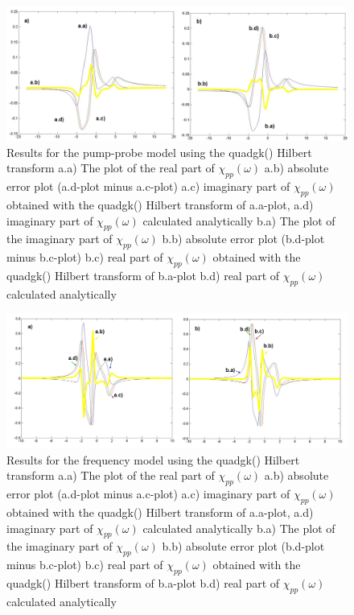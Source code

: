 \documentclass[12pt,twoside,a4paper]{article}
\numberwithin{equation}{subsection}
\numberwithin{figure}{subsection}
\begin{document}
\begin{figure} 
  \includegraphics[width=150mm]{img/quadgk_pnp.png}
  \caption{Results for the pump-probe model using the quadgk() Hilbert transform
     a.a) The plot of the real part of ${\chi_{pp}}(\omega )$
     a.b) absolute error plot (a.d-plot minus a.c-plot)
     a.c) imaginary part of ${\chi_{pp}}(\omega )$ obtained with the quadgk() Hilbert transform of a.a-plot, 
     a.d) imaginary part of ${\chi_{pp}}(\omega )$ calculated analytically 
     b.a) The plot of the imaginary part of ${\chi_{pp}}(\omega )$ 
     b.b) absolute error plot (b.d-plot minus b.c-plot)
     b.c) real part of $\chi_{pp} (\omega )$ obtained with the quadgk() Hilbert transform of b.a-plot 
     b.d) real part of $\chi_{pp} (\omega )$ calculated analytically 
     \label{fig:quadgk_pnp}
     }
\end{figure}

\begin{figure} 
  \includegraphics[width=150mm]{img/quadgk_fmix.png}
  \caption{Results for the frequency model using the quadgk() Hilbert transform
     a.a) The plot of the real part of ${\chi_{pp}}(\omega )$
     a.b) absolute error plot (a.d-plot minus a.c-plot)
     a.c) imaginary part of ${\chi_{pp}}(\omega )$ obtained with the quadgk() Hilbert transform of a.a-plot, 
     a.d) imaginary part of ${\chi_{pp}}(\omega )$ calculated analytically 
     b.a) The plot of the imaginary part of ${\chi_{pp}}(\omega )$ 
     b.b) absolute error plot (b.d-plot minus b.c-plot)
     b.c) real part of ${\chi_{pp}}(\omega )$ obtained with the quadgk() Hilbert transform of b.a-plot 
     b.d) real part of $\chi_{pp} (\omega )$ calculated analytically 
     \label{fig:quadgk_fmix}
     }
\end{figure} 
\end{document}
